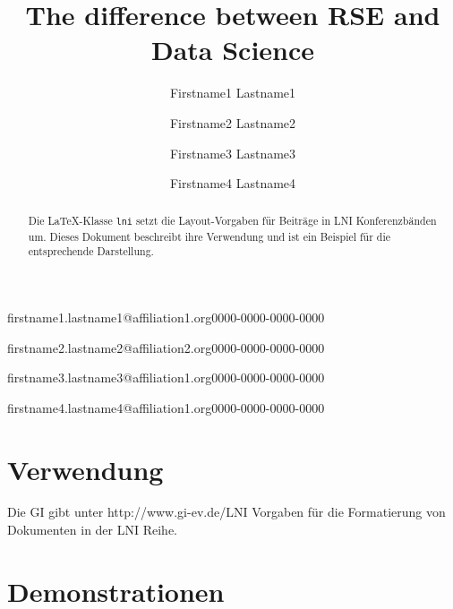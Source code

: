 \documentclass[
        english,biblatex
    ]{lni}
\begin{document}
        \title[]{The difference between RSE and Data Science}
    
    
    \author[1,2]{Firstname1 Lastname1}{firstname1.lastname1@affiliation1.org}{0000-0000-0000-0000}
    \author[2]{Firstname2 Lastname2}{firstname2.lastname2@affiliation2.org}{0000-0000-0000-0000}
    \author[3]{Firstname3 Lastname3}{firstname3.lastname3@affiliation1.org}{0000-0000-0000-0000}
    \author[1]{Firstname4 Lastname4}{firstname4.lastname4@affiliation1.org}{0000-0000-0000-0000}%




    \maketitle

        \begin{abstract}
        Die LaTeX-Klasse \texttt{lni} setzt die Layout-Vorgaben für
        Beiträge in LNI Konferenzbänden um. Dieses Dokument beschreibt
        ihre Verwendung und ist ein Beispiel für die entsprechende
        Darstellung.
    \end{abstract}
    
    
    \section{Verwendung}\label{verwendung}

    Die GI gibt unter http://www.gi-ev.de/LNI Vorgaben für die
    Formatierung von Dokumenten in der LNI Reihe.

    \section{Demonstrationen}\label{demos}
\end{document}
